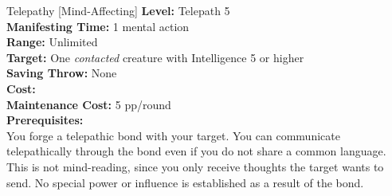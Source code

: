 {Telepathy [Mind-Affecting]}
{
	\textbf{Level:}
	Telepath 5\\
	\textbf{Manifesting Time:}
	1 mental action\\
	\textbf{Range:}
	Unlimited\\
	\textbf{Target:}
	One \emph{contacted} creature with Intelligence 5 or higher\\
	\textbf{Saving Throw:}
	None\\
	\textbf{Cost:}
	\\
	\textbf{Maintenance Cost:}
	5 pp/round\\
	\textbf{Prerequisites:}
	\\
}
{
	You forge a telepathic bond with your target. You can communicate telepathically through the bond even if you do not share a common language. This is not mind-reading, since you only receive thoughts the target wants to send. No special power or influence is established as a result of the bond.
}